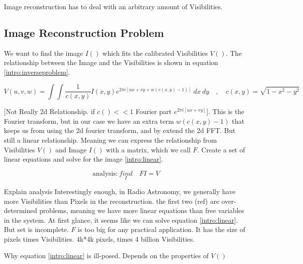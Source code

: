 Image reconstruction has to deal with an arbitrary amount of Visibilities.



\subsection{Image Reconstruction Problem}
We want to find the image $I()$ which fits the calibrated Visibilities $V()$. The relationship between the Image and the Visibilities is shown in equation \eqref{intro:inverseproblem}.

\begin{equation}\label{intro:inverseproblem}
V(u, v, w) = \int\int \frac{1}{c(x, y)} I(x, y) e^{2 \pi i [ux+vy+ w(c(x, y) - 1)]} \: dx \: dy \quad, \quad c(x,y) = \sqrt{1 - x^2 - y ^2}
\end{equation}

[Not Really 2d Relationship. if $c() << 1$ Fourier part $e^{2 \pi i [ux+vy]}$]. This is the Fourier transform, but in our case we have an extra term $w(c(x, y) - 1)$ that keeps us from using the 2d fourier transform, and by extend the 2d FFT.
But still a linear relationship. Meaning we can express the relationship from Visibilities $V()$ and Image $I()$ with a matrix, which we call $F$.
Create a set of linear equations and solve for the image \eqref{intro:linear}. 

\begin{equation}\label{intro:linear}
\text{analysis:}\: \underset{I}{find}\quad FI = V
\end{equation}

Explain analysis
Interestingly enough, in Radio Astronomy, we generally have more Visibilities than Pixels in the reconstruction. the first two (ref) are over-determined problems, meaning we have more linear equations than free variables in the system.
At first glance, it seems like we can solve equation \eqref{intro:linear}.
But set is incomplete.
$F$ is too big for any practical application. It has the size of pixels times Visibilities. 4k*4k pixels, times 4 billion Visibilities.

Why equation \eqref{intro:linear} is ill-posed. Depends on the properties of $V()$

